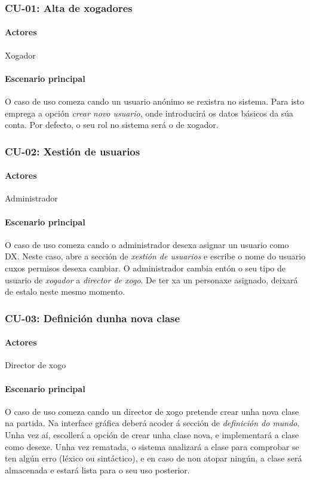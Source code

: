 \subsubsection{CU-01: Alta de xogadores}
\paragraph{Actores}
Xogador
\paragraph{Escenario principal}
O caso de uso comeza cando un usuario anónimo se rexistra no sistema. Para isto emprega a opción {\it crear novo usuario}, onde introducirá os datos básicos da súa conta. Por defecto, o seu rol no sistema será o de xogador.

\subsubsection{CU-02: Xestión de usuarios}
\paragraph{Actores}
Administrador
\paragraph{Escenario principal}
O caso de uso comeza cando o administrador desexa asignar un usuario como DX. Neste caso, abre a sección de {\it xestión de usuarios} e escribe o nome do usuario cuxos permisos desexa cambiar. O administrador cambia entón o seu tipo de usuario de {\it xogador} a {\it director de xogo}. De ter xa un personaxe asignado, deixará de estalo neste mesmo momento.


\subsubsection{CU-03: Definición dunha nova clase}
\paragraph{Actores}
Director de xogo
\paragraph{Escenario principal}
O caso de uso comeza cando un director de xogo pretende crear unha nova clase na partida. Na interface gráfica deberá acoder á sección de {\it definición do mundo}. Unha vez aí, escollerá a opción de crear unha clase nova, e implementará a clase como desexe. Unha vez rematada, o sistema analizará a clase para comprobar se ten algún erro (léxico ou sintáctico), e en caso de non atopar ningún, a clase será almacenada e estará lista para o seu uso posterior.

